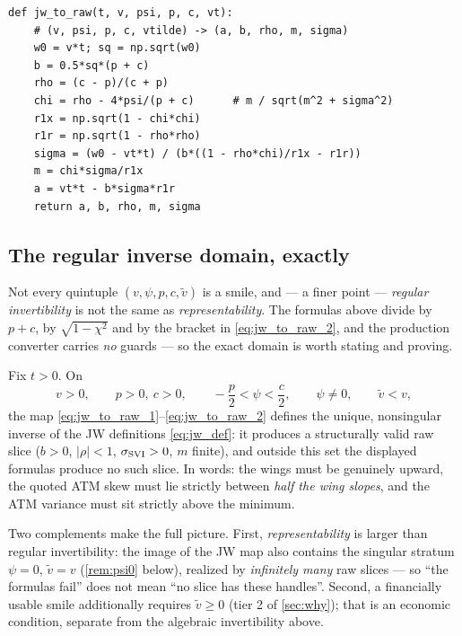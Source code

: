 \documentclass[11pt]{article}
\begin{document}
\begin{lstlisting}[caption={SVI-JW handles $\to$ raw SVI (distilled from
\texttt{models/svi\_jw/svi.py}; agrees with it to $10^{-12}$).},label={lst:jw2raw}]
def jw_to_raw(t, v, psi, p, c, vt):
    # (v, psi, p, c, vtilde) -> (a, b, rho, m, sigma)
    w0 = v*t; sq = np.sqrt(w0)
    b = 0.5*sq*(p + c)
    rho = (c - p)/(c + p)
    chi = rho - 4*psi/(p + c)      # m / sqrt(m^2 + sigma^2)
    r1x = np.sqrt(1 - chi*chi)
    r1r = np.sqrt(1 - rho*rho)
    sigma = (w0 - vt*t) / (b*((1 - rho*chi)/r1x - r1r))
    m = chi*sigma/r1x
    a = vt*t - b*sigma*r1r
    return a, b, rho, m, sigma
\end{lstlisting}

\subsection{The regular inverse domain, exactly}
\label{sec:domain}

Not every quintuple $(v,\psi,p,c,\widetilde v)$ is a smile, and --- a finer
point --- \emph{regular invertibility} is not the same as
\emph{representability}. The formulas above divide by $p+c$, by
$\sqrt{1-\chi^2}$ and by the bracket in \eqref{eq:jw_to_raw_2}, and the
production converter carries \emph{no} guards --- so the exact domain is worth
stating and proving.

\begin{proposition}
\label{prop:domain}
Fix $t>0$. On
\[
v>0,\qquad p>0,\ c>0,\qquad -\frac{p}{2}<\psi<\frac{c}{2},\qquad
\psi\neq0,\qquad \widetilde v<v ,
\]
the map \eqref{eq:jw_to_raw_1}--\eqref{eq:jw_to_raw_2} defines the unique,
nonsingular inverse of the JW definitions \eqref{eq:jw_def}: it produces a
structurally valid raw slice ($b>0$, $|\rho|<1$, $\sigma_{\mathrm{SVI}}>0$, $m$ finite), and
outside this set the displayed formulas produce no such slice. In words: the
wings must be genuinely upward, the quoted ATM skew must lie strictly between
\emph{half the wing slopes}, and the ATM variance must sit strictly above the
minimum.
\end{proposition}

Two complements make the full picture. First, \emph{representability} is
larger than regular invertibility: the image of the JW map also contains the
singular stratum $\psi=0$, $\widetilde v=v$ (\cref{rem:psi0} below), realized
by \emph{infinitely many} raw slices --- so ``the formulas fail'' does not
mean ``no slice has these handles''. Second, a financially usable smile
additionally requires $\widetilde v\ge0$ (tier 2 of \cref{sec:why}); that is
an economic condition, separate from the algebraic invertibility above.
\end{document}

